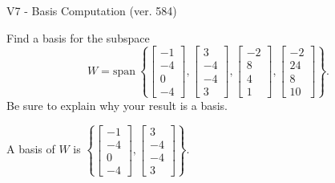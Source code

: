 \begin{exercise}
  \begin{exerciseTitle}V7 - Basis Computation (ver. 584)\end{exerciseTitle}
  \begin{exerciseStatement}
    Find a basis for the subspace 
\[W=\mathrm{span}\ \left\{\left[\begin{array}{r}
-1 \\
-4 \\
0 \\
-4
\end{array}\right] , \left[\begin{array}{r}
3 \\
-4 \\
-4 \\
3
\end{array}\right] , \left[\begin{array}{r}
-2 \\
8 \\
4 \\
1
\end{array}\right] , \left[\begin{array}{r}
-2 \\
24 \\
8 \\
10
\end{array}\right]\right\}.\]
 Be sure to explain why your result is a basis.


  \end{exerciseStatement}
  \begin{exerciseAnswer}
   A basis of \(W\) is  \(\left\{\left[\begin{array}{r}
-1 \\
-4 \\
0 \\
-4
\end{array}\right] , \left[\begin{array}{r}
3 \\
-4 \\
-4 \\
3
\end{array}\right]\right\}\).
  


  \end{exerciseAnswer}
\end{exercise}